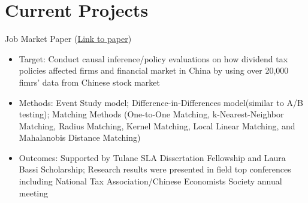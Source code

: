 \documentclass{resume}
\begin{document}
\section{Current Projects}
Job Market Paper (\href{https://liberalarts.tulane.edu/sites/liberalarts.tulane.edu/files/sites/default/files/Xie%20JMP_0.pdf}{Link to paper})
\begin{itemize}
  \item Target: Conduct causal inference/policy evaluations on how dividend tax policies affected firms and financial market in China by using over 20,000 fimrs' data from Chinese stock market 
  \item Methods: Event Study model; Difference-in-Differences model(similar to A/B testing); Matching Methods (One-to-One Matching, k-Nearest-Neighbor Matching, Radius Matching, Kernel Matching, Local Linear Matching, and Mahalanobis Distance Matching)
  \item Outcomes: Supported by Tulane SLA Dissertation Fellowship and Laura Bassi Scholarship; Research results were presented in field top conferences including National Tax Association/Chinese Economists Society annual meeting
\end{itemize}
\end{document}
